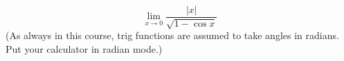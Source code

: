 \begin{equation*}
  \lim_{x\rightarrow 0} \frac{|x|}{\sqrt{1-\cos x}}
\end{equation*}
(As always in this course, trig functions are assumed to take angles in radians. Put
your calculator in radian mode.)

